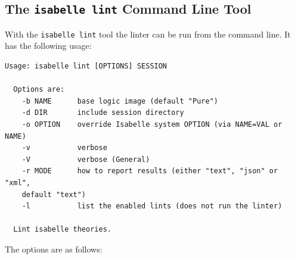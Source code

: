 \subsection{The \texttt{isabelle lint} Command Line Tool}
With the \texttt{isabelle lint} tool the linter can be run from the
command line. It has the following usage:
\begin{lstlisting}[keepspaces=true]
Usage: isabelle lint [OPTIONS] SESSION

  Options are:
    -b NAME      base logic image (default "Pure")
    -d DIR       include session directory
    -o OPTION    override Isabelle system OPTION (via NAME=VAL or NAME)
    -v           verbose
    -V           verbose (General)
    -r MODE      how to report results (either "text", "json" or "xml",
    default "text")
    -l           list the enabled lints (does not run the linter)

  Lint isabelle theories.

\end{lstlisting}
The options are as follows:
